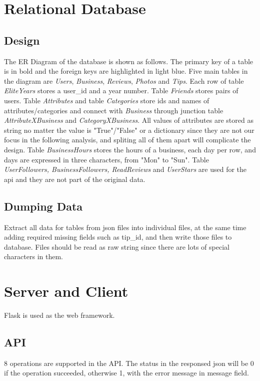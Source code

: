 \documentclass[12pt]{article}
\begin{document}
\section{Relational Database}\label{section-database}
\subsection{Design}
The ER Diagram of the database is shown as follows. The primary key of a table is in bold and the foreign keys are highlighted in light blue.
Five main tables in the diagram are {\it Users}, {\it Business}, {\it Reviews}, {\it Photos} and {\it Tips}. Each row of table {\it EliteYears} stores a user\_id and a year number. Table {\it Friends} stores pairs of users. Table {\it Attributes} and table {\it Categories} store ids and names of attributes/categories and connect with {\it Business} through junction table {\it AttributeXBusiness} and {\it CategoryXBusiness}. All values of attributes are stored as string no matter the value is "True"/"False" or a dictionary since they are not our focus in the following analysis, and spliting all of them apart will complicate the design. Table {\it BusinessHours} stores the hours of a business, each day per row, and days are expressed in three characters, from "Mon" to "Sun". Table {\it UserFollowers, BusinessFollowers, ReadReviews} and {\it UserStars} are used for the api and they are not part of the original data.
\subsection{Dumping Data}
Extract all data for tables from json files into individual files, at the same time adding required missing fields such as tip\_id, and then write those files to database. Files should be read as raw string since there are lots of special characters in them.
\section{Server and Client}\label{section-api}
Flask is used as the web framework.
\subsection{API}
8 operations are supported in the API. The status in the responsed json will be 0 if the operation succeeded, otherwise 1, with the error message in message field.
\end{document}
